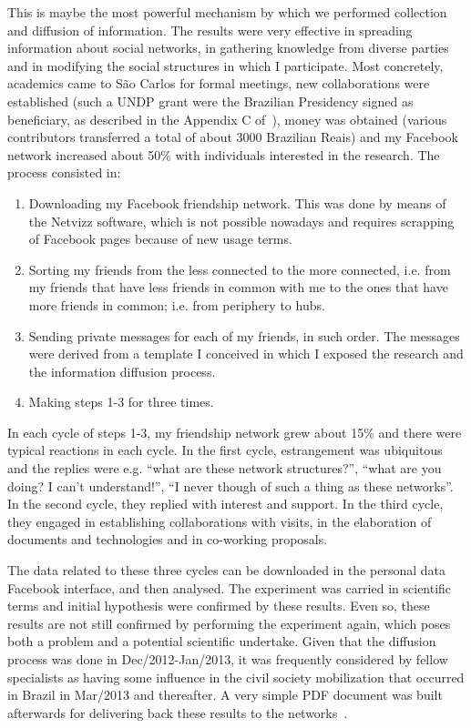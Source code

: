 \documentclass[a4paper]{article}
\begin{document}
This is maybe the most powerful mechanism by which we performed collection and diffusion of information.
The results were very effective in spreading information about social networks,
in gathering knowledge from diverse parties and in modifying the social structures
in which I participate.
Most concretely, academics came to São Carlos for formal meetings,
new collaborations were established (such a UNDP grant were the Brazilian Presidency signed as beneficiary,
as described in the Appendix C of~\cite{thesis}),
money was obtained (various contributors transferred a total of about 3000 Brazilian Reais)
and my Facebook network increased about 50\% with individuals interested in the research.
The process consisted in:
\begin{enumerate}
	\item Downloading my Facebook friendship network. This was done by means of the Netvizz software,
		which is not possible nowadays and requires scrapping of Facebook pages because of new usage terms.
	\item Sorting my friends from the less connected to the more connected, i.e. from my friends that have less friends in common with me to the ones that have more friends in common; i.e. from periphery to hubs.
	\item Sending private messages for each of my friends, in such order.
		The messages were derived from a template I conceived in which I exposed the research and the information diffusion process.
	\item Making steps 1-3 for three times.
\end{enumerate}
In each cycle of steps 1-3, my friendship network grew about 15\% and there were typical reactions in each cycle.
In the first cycle, estrangement was ubiquitous and the replies were e.g. ``what are these network structures?'',
``what are you doing? I can't understand!'', ``I never though of such a thing as these networks''.
In the second cycle, they replied with interest and support.
In the third cycle, they engaged in establishing collaborations with visits, in the elaboration of documents and technologies and
in co-working proposals.

The data related to these three cycles can be downloaded in the personal data Facebook interface, and then analysed.
The experiment was carried in scientific terms and initial hypothesis were confirmed by these results.
Even so, these results are not still confirmed by performing the experiment again,
which poses both a problem and a potential scientific undertake.
Given that the diffusion process was done in Dec/2012-Jan/2013, it was frequently considered by fellow specialists as
having some influence in the civil society mobilization that occurred in Brazil in Mar/2013 and thereafter.
A very simple PDF document was built afterwards for delivering back these results to the networks~\cite{docDif}.
\end{document}
